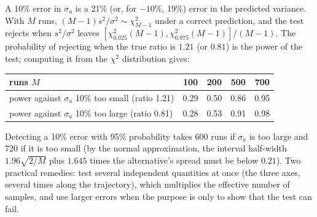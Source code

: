 \begin{solutions}
  \item A 10\% error in $\sigma_a$ is a 21\% (or, for $-10\%$, 19\%) error in the predicted variance. With $M$ runs, $(M - 1)s^2/\sigma^2 \sim \chi^2_{M-1}$ under a correct prediction,
        and the test rejects when $s^2/\sigma^2$ leaves $[\chi^2_{0.025}(M - 1), \chi^2_{0.975}(M - 1)]/(M - 1)$. The probability of rejecting when the true ratio is $1.21$ (or
        $0.81$) is the power of the test; computing it from the $\chi^2$ distribution gives:
        \begin{center}\small
        \begin{tabular}{@{}l c c c c@{}}
        \toprule
        runs $M$ & 100 & 200 & 500 & 700 \\
        \midrule
        power against $\sigma_a$ 10\% too small (ratio 1.21) & 0.29 & 0.50 & 0.86 & 0.95 \\
        power against $\sigma_a$ 10\% too large (ratio 0.81) & 0.28 & 0.53 & 0.91 & 0.98 \\
        \bottomrule
        \end{tabular}
        \end{center}
        Detecting a 10\% error with 95\% probability takes 600 runs if $\sigma_a$ is too large and 720 if it is too small (by the normal approximation, the interval half-width
        $1.96\sqrt{2/M}$ plus $1.645$ times the alternative's spread must be below $0.21$). Two practical remedies: test several independent quantities at
        once (the three axes, several times along the trajectory), which multiplies the effective number of samples, and use larger errors when the
        purpose is only to show that the test can fail.
\end{solutions}
